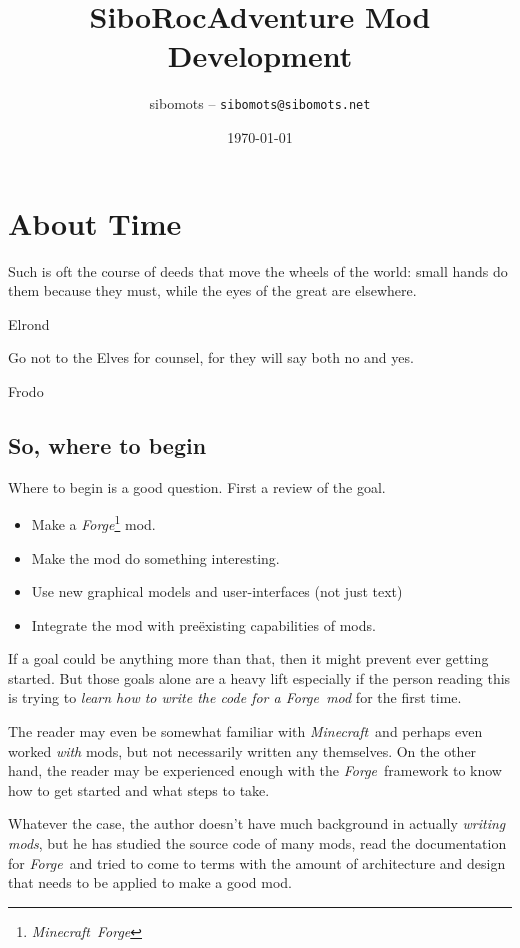 \documentclass[12pt]{memoir}
\date{\today}
\author{sibomots -- {\tt{sibomots@sibomots.net}}}
\title{ {\textbf{SiboRocAdventure Mod Development}} }
\newcommand{\minecraft}{{\textit{Minecraft}}}
\newcommand{\forge}{{\textit{Forge}}}
\begin{document}
\chapter{About Time}



\epigraph{Such is oft the course of deeds that move the wheels of
the world: small hands do them because they must, while the eyes of the
great are elsewhere.}{Elrond}
\epigraph{Go not to the Elves for counsel, for they will say both 
no and yes.}{Frodo}

\section{So, where to begin}

Where to begin is a good question.  First a review of the goal.

\begin{itemize}
\item Make a \forge\footnote{\minecraft\ \forge} mod.
\item Make the mod do something interesting.
\item Use new graphical models and user-interfaces (not just text)
\item Integrate the mod with pre\"existing capabilities of mods.
\end{itemize}

If a goal could be anything more than that, then it might prevent
ever getting started.  But those goals alone are a heavy lift especially
if the person reading this is trying to {\textit{learn how to write 
the code for a \forge\ mod}} for the first time.

The reader may even be somewhat familiar with \minecraft\ and perhaps
even worked {\textit{with}} mods, but not necessarily written any
themselves.  On the other hand, the reader may be experienced enough
with the \forge\ framework to know how to get started and what
steps to take. 

Whatever the case, the author doesn't have much background in
actually {\textit{writing mods}}, but he has studied the source code
of many mods, read the documentation for \forge\ and tried to come
to terms with the amount of architecture and design that needs to 
be applied to make a good mod.
\end{document}
